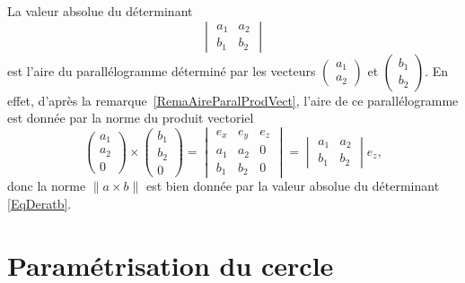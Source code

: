 La valeur absolue du déterminant
\begin{equation}        \label{EqDeratb}
	\begin{vmatrix}
		a_1 & a_2 \\
		b_1 & b_2
	\end{vmatrix}
\end{equation}
est l'aire du parallélogramme déterminé par les vecteurs $\begin{pmatrix}
		a_1 \\
		a_2
	\end{pmatrix}$ et $\begin{pmatrix}
		b_1 \\
		b_2
	\end{pmatrix}$. En effet, d'après la remarque~\ref{RemaAireParalProdVect}, l'aire de ce parallélogramme est donnée par la norme du produit vectoriel
\begin{equation}
	\begin{pmatrix}
		a_1 \\
		a_2 \\
		0
	\end{pmatrix}\times
	\begin{pmatrix}
		b_1 \\
		b_2 \\
		0
	\end{pmatrix}=\begin{vmatrix}
		e_x & e_y & e_z \\
		a_1 & a_2 & 0   \\
		b_1 & b_2 & 0
	\end{vmatrix}=
	\begin{vmatrix}
		a_1 & a_2 \\
		b_1 & b_2
	\end{vmatrix}e_z,
\end{equation}
donc la norme $\| a\times b \|$ est bien donnée par la valeur absolue du déterminant \eqref{EqDeratb}.

\section{Paramétrisation du cercle}

